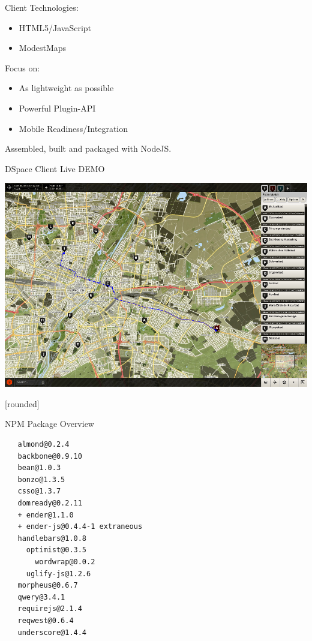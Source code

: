 \documentclass{beamer}
\newcommand\Fontvi{\fontsize{6}{7.2}\selectfont}
\begin{document}
\begin{frame}{Client}
 Technologies:
 \begin{itemize}
  \item HTML5/JavaScript
  \item ModestMaps
 \end{itemize}
 \vspace{1em}
 Focus on:
 \begin{itemize}
  \item As lightweight as possible
  \item Powerful Plugin-API
  \item Mobile Readiness/Integration
 \end{itemize}
 \vspace{1em}
 Assembled, built and packaged with NodeJS.
\end{frame}

\begin{frame}{DSpace Client Live DEMO}
 \linebreak
 \begin{center}
  \includegraphics[scale=0.3]{images/dspace_client_ui}
 \end{center}
\end{frame}

[rounded]
\begin{frame}[fragile]{NPM Package Overview}
\Fontvi
{}
\begin{block}{}
\begin{lstlisting}
   almond@0.2.4
   backbone@0.9.10
   bean@1.0.3
   bonzo@1.3.5
   csso@1.3.7
   domready@0.2.11
   + ender@1.1.0
   + ender-js@0.4.4-1 extraneous
   handlebars@1.0.8
     optimist@0.3.5
       wordwrap@0.0.2
     uglify-js@1.2.6
   morpheus@0.6.7
   qwery@3.4.1
   requirejs@2.1.4
   reqwest@0.6.4
   underscore@1.4.4
\end{lstlisting}
\end{block}
\end{frame}
\end{document}
